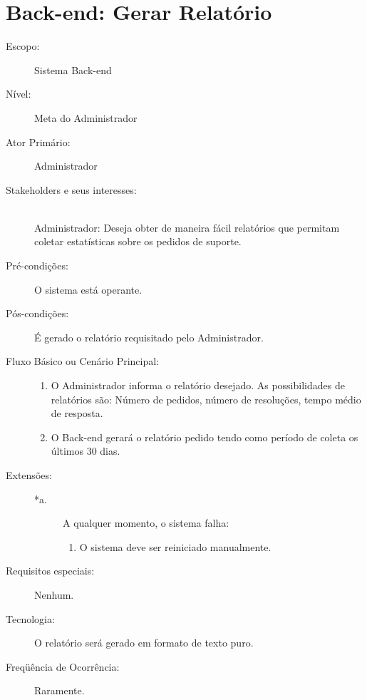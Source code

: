 \documentclass[brazil,times]{abnt}
\begin{document}
\section{Back-end: Gerar Relatório}
\begin{description}
\item[Escopo:] Sistema Back-end
\item[Nível:] Meta do Administrador
\item[Ator Primário:] Administrador
\item[Stakeholders e seus interesses:] \hfill \\
Administrador: Deseja obter de maneira fácil relatórios que permitam coletar
estatísticas sobre os pedidos de suporte.

\item[Pré-condições:] O sistema está operante.
\item[Pós-condições:]  É gerado o relatório requisitado pelo Administrador.
\item[Fluxo Básico ou Cenário Principal:]\hfill
\begin{enumerate}
  \item O Administrador informa o relatório desejado. As possibilidades de
  relatórios são: Número de pedidos, número de resoluções, tempo médio de
  resposta.
  \item O Back-end gerará o relatório pedido tendo como período de coleta os
  últimos 30 dias.
\end{enumerate}

\item[Extensões:]\hfill
\begin{description}
	\item[*a.] A qualquer momento, o sistema falha: \hfill
	\begin{enumerate}
 		\item O sistema deve ser reiniciado manualmente.
	\end{enumerate} 
\end{description}
\item[Requisitos especiais:] Nenhum.
\item[Tecnologia:] O relatório será gerado em formato de texto puro.
\item[Freqüência de Ocorrência:] Raramente.

\end{description}
\end{document}
